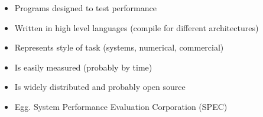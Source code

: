 \begin{itemize}
	\item Programs designed to test performance
	\item Written in high level languages (compile for different architectures)
	\item Represents style of task (systems, numerical, commercial)
	\item Is easily measured (probably by time)
	\item Is widely distributed and probably open source
	\item Egg. System Performance Evaluation Corporation (SPEC)
\end{itemize}
